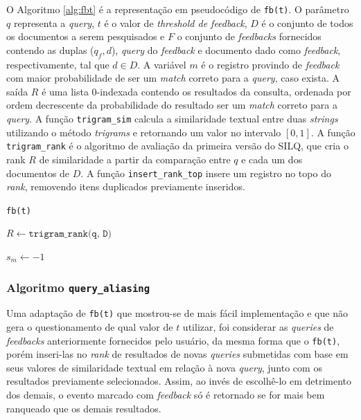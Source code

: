 \documentclass[12pt]{article}
\begin{document}
O Algoritmo \ref{alg:fbt} é a representação em pseudocódigo de \texttt{fb(t)}. O parâmetro $q$ representa a \textit{query}, $t$ é o valor de \textit{threshold de feedback}, $D$ é o conjunto de todos os documentos a serem pesquisados e $F$ o conjunto de \textit{feedbacks} fornecidos contendo as duplas ($q_f, d$), \textit{query} do \textit{feedback} e documento dado como \textit{feedback}, respectivamente, tal que $d \in D$. A variável $m$ é o registro provindo de \textit{feedback} com maior probabilidade de ser um \textit{match} correto para a \textit{query}, caso exista. A saída $R$ é uma lista 0-indexada contendo os resultados da consulta, ordenada por ordem decrescente da probabilidade do resultado ser um \textit{match} correto para a \textit{query}. A função \texttt{trigram\_sim} calcula a similaridade textual entre duas \textit{strings} utilizando o método \textit{trigrams} e retornando um valor no intervalo $[0, 1]$. A função \texttt{trigram\_rank} é o algoritmo de avaliação da primeira versão do SILQ, que cria o rank $R$ de similaridade a partir da comparação entre $q$ e cada um dos documentos de $D$. A função \texttt{insert\_rank\_top} insere um registro no topo do \textit{rank}, removendo itens duplicados previamente inseridos.

\begin{algorithm}
\caption{\texttt{fb(t)}}
\label{alg:fbt}
\LinesNumbered
{}
\SetAlgoLined
{}

$R \gets \texttt{trigram\_rank(q, D)}$

$s_m \gets -1$



\end{algorithm}

\subsubsection{Algoritmo \texttt{query\_aliasing}}

Uma adaptação de \texttt{fb(t)} que mostrou-se de mais fácil implementação e que não gera o questionamento de qual valor de $t$ utilizar, foi considerar as \textit{queries} de \textit{feedbacks} anteriormente fornecidos pelo usuário, da mesma forma que o \texttt{fb(t)}, porém inseri-las no \textit{rank} de resultados de novas \textit{queries} submetidas com base em seus valores de similaridade textual em relação à nova \textit{query}, junto com os resultados previamente selecionados. Assim, ao invés de escolhê-lo em detrimento dos demais, o evento marcado com \textit{feedback} só é retornado se for mais bem ranqueado que os demais resultados.
\end{document}

